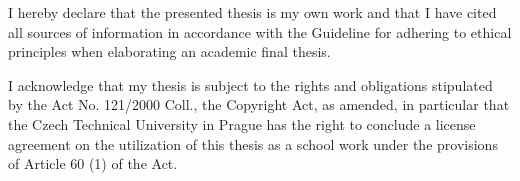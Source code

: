 \begin{declarationpage}
I hereby declare that the presented thesis is my own work and that I have cited all sources of information in accordance with the Guideline for adhering to ethical principles when elaborating an academic final thesis.

I acknowledge that my thesis is subject to the rights and obligations stipulated by the Act No. 121/2000 Coll., the Copyright Act, as amended, in particular that the Czech Technical University in Prague has the right to conclude a license agreement on the utilization of this thesis as a school work under the provisions of Article 60 (1) of the Act.
\end{declarationpage}
